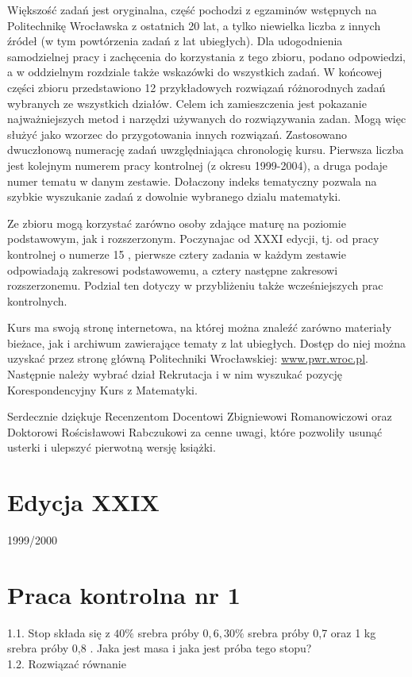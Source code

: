 \documentclass[10pt]{article}
\begin{document}
Większość zadań jest oryginalna, część pochodzi z egzaminów wstępnych na Politechnikę Wrocławska z ostatnich 20 lat, a tylko niewielka liczba z innych źródeł (w tym powtórzenia zadań z lat ubiegłych). Dla udogodnienia samodzielnej pracy i zachęcenia do korzystania z tego zbioru, podano odpowiedzi, a w oddzielnym rozdziale także wskazówki do wszystkich zadań. W końcowej części zbioru przedstawiono 12 przykładowych rozwiązań różnorodnych zadań wybranych ze wszystkich działów. Celem ich zamieszczenia jest pokazanie najważniejszych metod i narzędzi używanych do rozwiązywania zadan. Mogą więc służyć jako wzorzec do przygotowania innych rozwiązań. Zastosowano dwuczłonową numerację zadań uwzględniająca chronologię kursu. Pierwsza liczba jest kolejnym numerem pracy kontrolnej (z okresu 1999-2004), a druga podaje numer tematu w danym zestawie. Dołaczony indeks tematyczny pozwala na szybkie wyszukanie zadań z dowolnie wybranego dzialu matematyki.

Ze zbioru mogą korzystać zarówno osoby zdające maturę na poziomie podstawowym, jak i rozszerzonym. Poczynajac od XXXI edycji, tj. od pracy kontrolnej o numerze 15 , pierwsze cztery zadania w każdym zestawie odpowiadają zakresowi podstawowemu, a cztery następne zakresowi rozszerzonemu. Podzial ten dotyczy w przybliżeniu także wcześniejszych prac kontrolnych.

Kurs ma swoją stronę internetowa, na której można znaleźć zarówno materiały bieżace, jak i archiwum zawierające tematy z lat ubiegłych. Dostęp do niej można uzyskać przez stronę główną Politechniki Wrocławskiej: \href{http://www.pwr.wroc.pl}{www.pwr.wroc.pl}. Następnie należy wybrać dział Rekrutacja i w nim wyszukać pozycję Korespondencyjny Kurs z Matematyki.

Serdecznie dziękuje Recenzentom Docentowi Zbigniewowi Romanowiczowi oraz Doktorowi Rościsławowi Rabczukowi za cenne uwagi, które pozwoliły usunąć usterki i ulepszyć pierwotną wersję książki.

\section*{Edycja XXIX}
1999/2000

\section*{Praca kontrolna nr 1}
1.1. Stop składa się z $40 \%$ srebra próby $0,6,30 \%$ srebra próby 0,7 oraz 1 kg srebra próby 0,8 . Jaka jest masa i jaka jest próba tego stopu?\\
1.2. Rozwiązać równanie
\end{document}
